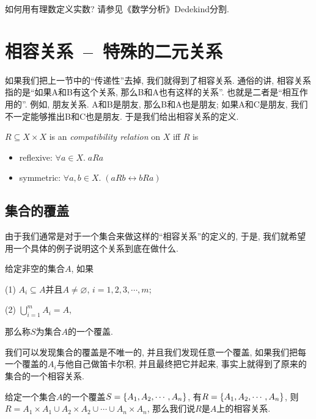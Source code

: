 如何用有理数定义实数? 请参见《数学分析》Dedekind分割. 

\section{相容关系~--~特殊的二元关系}

如果我们把上一节中的``传递性''去掉, 我们就得到了相容关系. 通俗的讲, 相容关系指的是``如果A和B有这个关系, 那么B和A也有这样的关系''. 也就是二者是``相互作用的''. 例如, 朋友关系. A和B是朋友, 那么B和A也是朋友; 如果A和C是朋友, 我们不一定能够推出B和C也是朋友. 于是我们给出相容关系的定义. 

\begin{definition}
  $R \subseteq X \times X$ is an {\it compatibility relation} on $X$ iff $R$ is
  \begin{itemize}
    \item reflexive: $\forall a \in X.\; a R a$
    \item symmetric: $\forall a, b \in X.\; (a R b \leftrightarrow b R a)$
  \end{itemize}
\end{definition}

\subsection{集合的覆盖}

由于我们通常是对于一个集合来做这样的``相容关系''的定义的, 于是, 我们就希望用一个具体的例子说明这个关系到底在做什么.

\begin{definition}
	给定非空的集合$A$, 如果
	
	(1) $A_i \subseteq A$并且$A\neq \varnothing$, $i=1,2,3,\cdots,m $;
	
	(2) $\bigcup_{i=1}^m A_i = A$, 
	
	那么称$S$为集合$A$的一个覆盖. 
\end{definition} 

我们可以发现集合的覆盖是不唯一的, 并且我们发现任意一个覆盖, 如果我们把每一个覆盖的$A_i$与他自己做笛卡尔积, 并且最终把它并起来, 事实上就得到了原来的集合的一个相容关系. 

\begin{theorem}
	给定一个集合$A$的一个覆盖$S=\{A_1 ,A_2 ,\cdots, A_n \}$, 有$R=\{A_1, A_2, \cdots , A_n\}$, 则$R=A_1\times A_1 \cup A_2 \times A_2\cup \cdots \cup A_n \times A_n$, 那么我们说$R$是$A$上的相容关系. 
\end{theorem}


